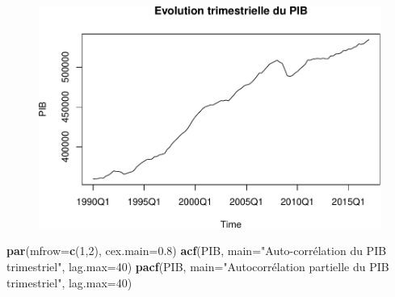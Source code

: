 \documentclass[11pt,]{article}
\newenvironment{Shaded}{\begin{snugshade}}{\end{snugshade}}
\newcommand{\KeywordTok}[1]{\textcolor[rgb]{0.13,0.29,0.53}{\textbf{#1}}}
\newcommand{\DataTypeTok}[1]{\textcolor[rgb]{0.13,0.29,0.53}{#1}}
\newcommand{\DecValTok}[1]{\textcolor[rgb]{0.00,0.00,0.81}{#1}}
\newcommand{\FloatTok}[1]{\textcolor[rgb]{0.00,0.00,0.81}{#1}}
\newcommand{\StringTok}[1]{\textcolor[rgb]{0.31,0.60,0.02}{#1}}
\newcommand{\OperatorTok}[1]{\textcolor[rgb]{0.81,0.36,0.00}{\textbf{#1}}}
\newcommand{\NormalTok}[1]{#1}
\begin{document}
\begin{Shaded}
\end{Shaded}

\begin{figure}

{\centering \includegraphics{doc_files/figure-latex/unnamed-chunk-3-1} 

}

\caption{\label{fig3}}\label{fig:unnamed-chunk-3}
\end{figure}

\begin{Shaded}
\begin{Highlighting}[]
  \KeywordTok{par}\NormalTok{(}\DataTypeTok{mfrow=}\KeywordTok{c}\NormalTok{(}\DecValTok{1}\NormalTok{,}\DecValTok{2}\NormalTok{), }\DataTypeTok{cex.main=}\FloatTok{0.8}\NormalTok{)}
  \KeywordTok{acf}\NormalTok{(PIB, }\DataTypeTok{main=}\StringTok{"Auto-corrélation }
\StringTok{      du PIB trimestriel"}\NormalTok{, }\DataTypeTok{lag.max=}\DecValTok{40}\NormalTok{)}
  \KeywordTok{pacf}\NormalTok{(PIB, }\DataTypeTok{main=}\StringTok{"Autocorrélation partielle}
\StringTok{       du PIB trimestriel"}\NormalTok{, }\DataTypeTok{lag.max=}\DecValTok{40}\NormalTok{)}
\end{Highlighting}
\end{Shaded}
\end{document}
